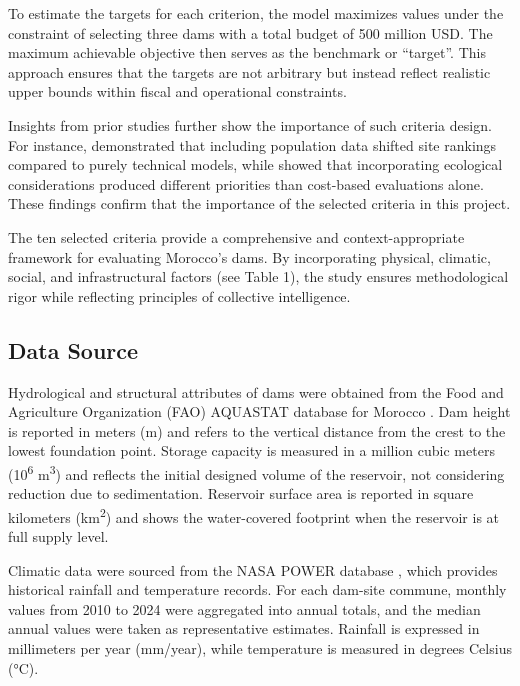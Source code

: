 To estimate the targets for each criterion, the model maximizes values under the constraint of selecting three dams with a total budget of 500 million USD. The maximum achievable objective then serves as the benchmark or “target”. This approach ensures that the targets are not arbitrary but instead reflect realistic upper bounds within fiscal and operational constraints.
                                                                                                
Insights from prior studies further show the importance of such criteria design. For instance,\cite{Rana2020} demonstrated that including population data shifted site rankings compared to purely technical models, while \cite{TEMEL2023159152} showed that incorporating ecological considerations produced different priorities than cost-based evaluations alone. These findings confirm that the importance of the selected criteria in this project.

The ten selected criteria provide a comprehensive and context-appropriate framework for evaluating Morocco's dams. By incorporating physical, climatic, social, and infrastructural factors (see Table 1), the study ensures methodological rigor while reflecting principles of collective intelligence.

\subsection{Data Source}
Hydrological and structural attributes of dams were obtained from the Food and Agriculture Organization (FAO) AQUASTAT database for Morocco \cite{FAO_AQUASTAT_MAR}. Dam height is reported in meters (m) and refers to the vertical distance from the crest to the lowest foundation point. Storage capacity is measured in a million cubic meters (10\textsuperscript{6} m\textsuperscript{3}) and reflects the initial designed volume of the reservoir, not considering reduction due to sedimentation. Reservoir surface area is reported in square kilometers (km\textsuperscript{2}) and shows the water-covered footprint when the reservoir is at full supply level.

Climatic data were sourced from the NASA POWER database \cite{NASA_POWER_API}, which provides historical rainfall and temperature records. For each dam-site commune, monthly values from 2010 to 2024 were aggregated into annual totals, and the median annual values were taken as representative estimates. Rainfall is expressed in millimeters per year (mm/year), while temperature is measured in degrees Celsius (°C).

